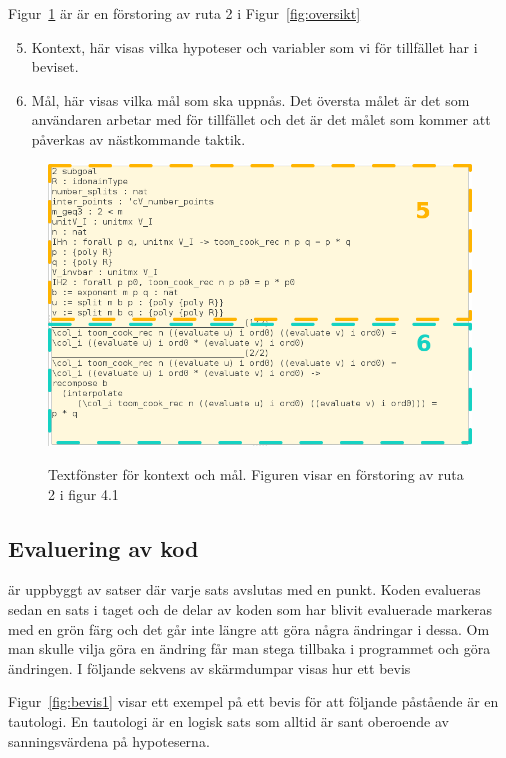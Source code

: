 Figur~\ref{fig:kontext} är är en förstoring av ruta 2 i Figur~\ref{fig:oversikt}
\begin{enumerate}
  \setcounter{enumi}{4}
\item Kontext, här visas vilka hypoteser och variabler som vi för tillfället
  har i beviset.
\item Mål, här visas vilka mål som ska uppnås. Det översta målet är det som
  användaren arbetar med för tillfället och det är det målet som kommer att
  påverkas av nästkommande taktik.
\end{enumerate}

\begin{figure}[H]
  \centering
  \includegraphics[width=150mm]{images/Kontext}
  \label{fig:kontext}
  \caption[Fönster för kontext och mål]
   {Textfönster för kontext och mål. Figuren visar en förstoring av ruta 2 i
    figur 4.1}
\end{figure}




\subsection{Evaluering av kod}
\coq{} är uppbyggt av satser där varje sats avslutas med en punkt. Koden
evalueras sedan en sats i taget och de delar av koden som har blivit evaluerade
markeras med en grön färg och det går inte längre att göra några ändringar i
dessa. Om man skulle vilja göra en ändring får man stega tillbaka
i programmet och göra ändringen. I följande sekvens av skärmdumpar visas
hur ett bevis

Figur~\ref{fig:bevis1} visar ett exempel på ett bevis för att följande påstående
är en tautologi. En tautologi är en logisk sats som alltid är sant oberoende av
sanningsvärdena på hypoteserna.


